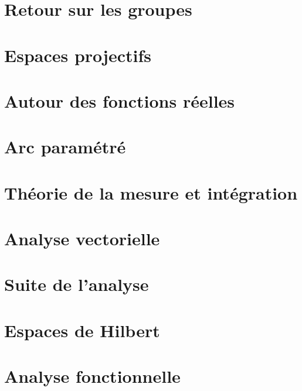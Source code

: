 \chapter{Retour sur les groupes}



\chapter{Espaces projectifs}


\chapter{Autour des fonctions réelles}






\chapter{Arc paramétré}


\chapter{Théorie de la mesure et intégration}






\chapter{Analyse vectorielle}


\chapter{Suite de l'analyse}






\chapter{Espaces de Hilbert}


\chapter{Analyse fonctionnelle}



